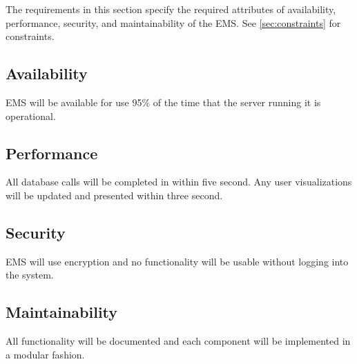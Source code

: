 
The requirements in this section specify the required attributes
 of availability, performance, security, and
maintainability of the EMS.  See \autoref{sec:constraints} for constraints.

\subsection{Availability} 

EMS will be available for use 95\% of the time that the server running it is
operational.

\subsection{Performance} 

All database calls will be completed in within five second. Any user
visualizations will be updated and presented within three second.

\subsection{Security} 

EMS will use encryption and no functionality will be usable without logging into
the system.

\subsection{Maintainability} 

All functionality will be documented and each component will be implemented in a
modular fashion.

